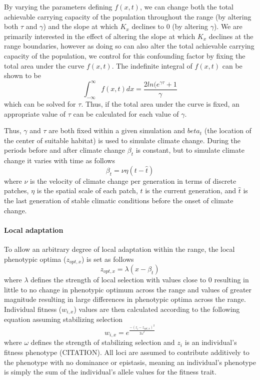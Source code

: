 \documentclass[11pt, oneside]{article}
\begin{document}
By varying the parameters defining $f(x,t)$, we can change both the total achievable carrying capacity of the population throughout the range (by altering both $\tau$ and $\gamma$) and the slope at which $K_{x}$ declines to $0$ (by altering $\gamma$). We are primarily interested in the effect of altering the slope at which $K_{x}$ declines at the range boundaries, however as doing so can also alter the total achievable carrying capacity of the population, we control for this confounding factor by fixing the total area under the curve $f(x,t)$. The indefinite integral of $f(x,t)$ can be shown to be
\begin{equation}
\int_{-\infty}^{\infty}f(x,t)dx = \frac{2ln(e^{\gamma\tau}+1}{\gamma}
\end{equation}
which can be solved for $\tau$. Thus, if the total area under the curve is fixed, an appropriate value of $\tau$ can be calculated for each value of $\gamma$.

Thus, $\gamma$ and $\tau$ are both fixed within a given simulation and $beta_{t}$ (the location of the center of suitable habitat) is used to simulate climate change. During the periods before and after climate change $\beta_{t}$ is constant, but to simulate climate change it varies with time as follows
\begin{equation}
\beta_{t}=\nu\eta(t-\hat{t})
\end{equation}
where $\nu$ is the velocity of climate change per generation in terms of discrete patches, $\eta$ is the spatial scale of each patch, $t$ is the current generation, and $\hat{t}$ is the last generation of stable climatic conditions before the onset of climate change.

\paragraph{Local adaptation}
To allow an arbitrary degree of local adaptation within the range, the local phenotypic optima ($z_{opt,x}$) is set as follows
\begin{equation}
z_{opt,x}=\lambda(x-\beta_{t})
\end{equation}
where $\lambda$ defines the strength of local selection with values close to $0$ resulting in little to no change in phenotypic optimum across the range and values of greater magnitude resulting in large differences in phenotypic optima across the range. Individual fitness ($w_{i,x}$) values are then calculated according to the following equation assuming stabilizing selection
\begin{equation}
w_{i,x}=e^{\frac{-(z_{i}-z_{opt,x})^{2}}{2\omega^{2}}}
\end{equation}
where $\omega$ defines the strength of stabilizing selection and $z_{i}$ is an individual's fitness phenotype (CITATION). All loci are assumed to contribute additively to the phenotype with no dominance or epistasis, meaning an individual's phenotype is simply the sum of the individual's allele values for the fitness trait.
\end{document}
